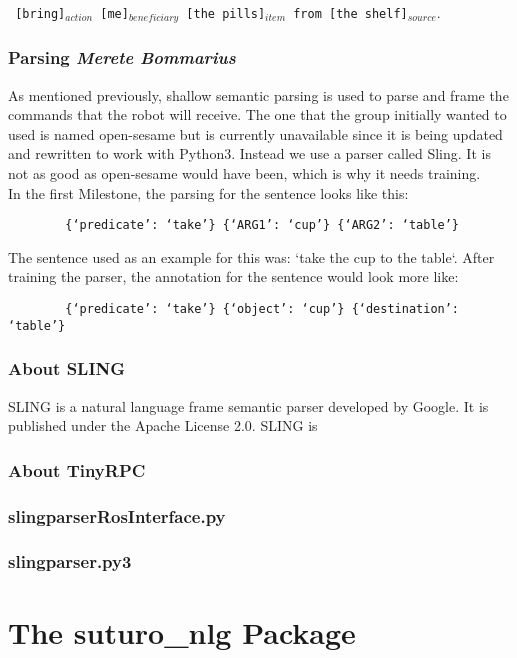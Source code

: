 \documentclass[main.tex]{subfiles}
\begin{document}
        \texttt{ [bring]$_{action}$  [me]$_{beneficiary}$ [the pills]$_{item}$ from [the shelf]$_{source}.$}
        \subsubsection{Parsing \small{\textit{Merete Bommarius}}}     
        As mentioned previously, shallow semantic parsing is used to parse and frame the commands that the robot will receive. The one that the group initially wanted to used is named open-sesame but is currently unavailable since it is being updated and rewritten to work with Python3. Instead we use a parser called Sling. It is not as good as open-sesame would have been, which is why it needs training.\\ 
        In the first Milestone, the parsing for the sentence looks like this:
        
        \begin{verbatim}
        {‘predicate’: ‘take’} {‘ARG1’: ‘cup’} {‘ARG2’: ‘table’}
        \end{verbatim}
        
        The sentence used as an example for this was: ‘take the cup to the table‘. After training the parser, the annotation for the sentence would look more like:
        
        \begin{verbatim}
        {‘predicate’: ‘take’} {‘object’: ‘cup’} {‘destination’: ‘table’}
        \end{verbatim}
        
		\subsubsection{About SLING}
        SLING is a natural language frame semantic parser developed by Google. It is published under the Apache License 2.0. SLING is  
		\subsubsection{About TinyRPC}
		\subsubsection{slingparserRosInterface.py}
		\subsubsection{slingparser.py3}
			
	
	\section{The suturo\_nlg Package}
\end{document}
